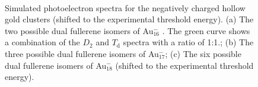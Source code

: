\begin{figure}[htbp]
\begin{center}
    \hfill
    \\
\caption{Simulated photoelectron spectra for the negatively charged hollow gold
    clusters (shifted to the experimental threshold energy). (a) The two
    possible dual fullerene isomers of Au$_{16}^-$ . The green curve shows a
    combination of the $D_\mathrm{2}$ and $T_\mathrm{d}$ spectra with a ratio of 1:1.; (b) The
    three possible dual fullerene isomers of Au$_{17}^-$; (c) The six possible
    dual fullerene isomers of Au$_{18}^-$ (shifted to the experimental
    threshold energy).}
  \label{fig:photo_Au16}
\end{center}
\end{figure}


